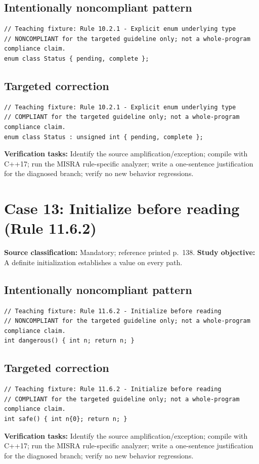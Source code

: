\documentclass[10pt,letterpaper]{article}
\begin{document}
\subsection*{Intentionally noncompliant pattern}
\begin{lstlisting}
// Teaching fixture: Rule 10.2.1 - Explicit enum underlying type
// NONCOMPLIANT for the targeted guideline only; not a whole-program compliance claim.
enum class Status { pending, complete };
\end{lstlisting}
\subsection*{Targeted correction}
\begin{lstlisting}
// Teaching fixture: Rule 10.2.1 - Explicit enum underlying type
// COMPLIANT for the targeted guideline only; not a whole-program compliance claim.
enum class Status : unsigned int { pending, complete };
\end{lstlisting}
\textbf{Verification tasks:} Identify the source amplification/exception; compile with C++17; run the MISRA rule-specific analyzer; write a one-sentence justification for the diagnosed branch; verify no new behavior regressions.

\section{Case 13: Initialize before reading (Rule 11.6.2)}
\textbf{Source classification:} Mandatory; reference printed p.~138. \textbf{Study objective:} A definite initialization establishes a value on every path.
\subsection*{Intentionally noncompliant pattern}
\begin{lstlisting}
// Teaching fixture: Rule 11.6.2 - Initialize before reading
// NONCOMPLIANT for the targeted guideline only; not a whole-program compliance claim.
int dangerous() { int n; return n; }
\end{lstlisting}
\subsection*{Targeted correction}
\begin{lstlisting}
// Teaching fixture: Rule 11.6.2 - Initialize before reading
// COMPLIANT for the targeted guideline only; not a whole-program compliance claim.
int safe() { int n{0}; return n; }
\end{lstlisting}
\textbf{Verification tasks:} Identify the source amplification/exception; compile with C++17; run the MISRA rule-specific analyzer; write a one-sentence justification for the diagnosed branch; verify no new behavior regressions.
\end{document}
